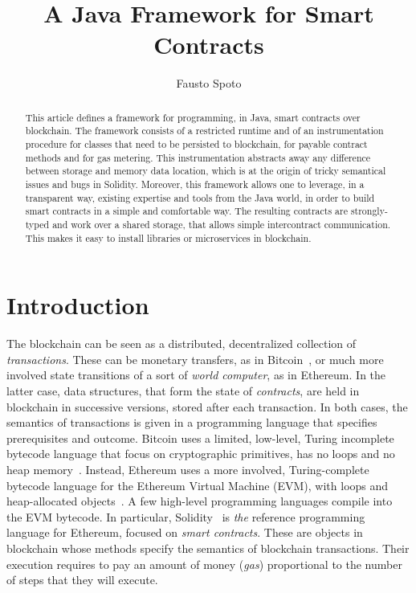 \documentclass[10pt]{llncs}
\begin{document}
\title{
  A Java Framework for Smart Contracts}

\author{Fausto Spoto}

\maketitle

\begin{abstract}
  This article defines a framework for programming, in Java, smart contracts
  over blockchain.
  The framework consists of a restricted runtime and of an instrumentation
  procedure for classes that need to be persisted to blockchain,
  for payable contract methods and for gas metering.
  This instrumentation
  abstracts away any difference between storage and memory data location,
  which is at the origin of tricky semantical issues and bugs in Solidity.
  Moreover, this framework allows one to leverage, in a transparent way,
  existing expertise and tools from the Java world, in order to build
  smart contracts in a simple and comfortable way. The resulting contracts
  are strongly-typed and work over a shared storage, that allows simple
  intercontract communication.
  This makes it easy to install libraries
  or microservices in blockchain.
\end{abstract}

\section{Introduction}\label{sec:introduction}

The blockchain can be seen as a distributed, decentralized
collection of \emph{transactions}. These can be
monetary transfers, as in Bitcoin~\cite{Nakamoto08}, or much more
involved state transitions
of a sort of \emph{world computer}, as in Ethereum.
In the latter case, data structures, that form the state of \emph{contracts},
are held in blockchain in successive versions,
stored after each transaction. In both cases, the semantics of transactions is
given in a programming language that specifies prerequisites
and outcome. Bitcoin uses a limited, low-level,
Turing incomplete bytecode language that focus
on cryptographic primitives, has no loops and
no heap memory~\cite{Antonopoulos17}.
Instead, Ethereum uses a more involved,
Turing-complete bytecode language for the Ethereum Virtual Machine (EVM),
with loops and heap-allocated objects~\cite{AntonopoulosW18}. A few high-level
programming languages compile into the EVM bytecode. In particular,
Solidity~\cite{solidity}
is \emph{the} reference programming language for Ethereum,
focused on \emph{smart contracts}. These are objects
in blockchain whose methods specify the semantics of blockchain transactions.
Their execution requires to pay an amount of money (\emph{gas})
proportional to the number of steps that they will execute.
\end{document}
